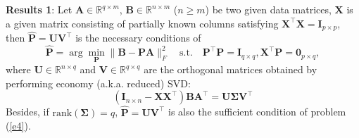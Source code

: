 \documentclass[titlepage,11pt,twoside]{article}
\begin{document}
\textbf{Results 1}: Let $\mathbf{A}\in \mathbb{R}^{q\times m}$, $\mathbf{B}\in \mathbb{R}^{n\times m}$ ($n\ge m$) be two given data matrices, $\mathbf{X}$ is a given matrix consisting of partially known columns satisfying $\mathbf{X}^{\top}\mathbf{X}=\mathbf{I}_{p\times p}$, then $\mathbf{\hat{P}} = \mathbf{U}\mathbf{V}^{\top}$ is the necessary conditions of
\begin{equation}\label{e4}
\mathbf{\hat{P}}=\arg\min_{\mathbf{P}}\|\mathbf{B}-\mathbf{P}\mathbf{A}\|_{F}^{2}
\quad
\text{s.t.}
\quad
\mathbf{P}^{\top}\mathbf{P} = \mathbf{I}_{q\times q}, \mathbf{X}^{\top}\mathbf{P} = \mathbf{0}_{p\times q},
\end{equation}
where $\mathbf{U}\in \mathbb{R}^{n\times q}$ and $\mathbf{V}\in \mathbb{R}^{q\times q}$ are the orthogonal matrices obtained by performing economy (a.k.a. reduced) SVD:
\begin{equation}\label{e5}
(\mathbf{I}_{n\times n}-\mathbf{X}\mathbf{X}^{\top})\mathbf{B}\mathbf{A}^{\top} = \mathbf{U}\mathbf{\mathbf{\Sigma}}\mathbf{V}^{\top}
\end{equation}
Besides, if $\text{rank}(\mathbf{\Sigma})=q$, $\mathbf{\hat{P}} = \mathbf{U}\mathbf{V}^{\top}$ is also the sufficient condition of problem (\ref{e4}). 
\end{document}
